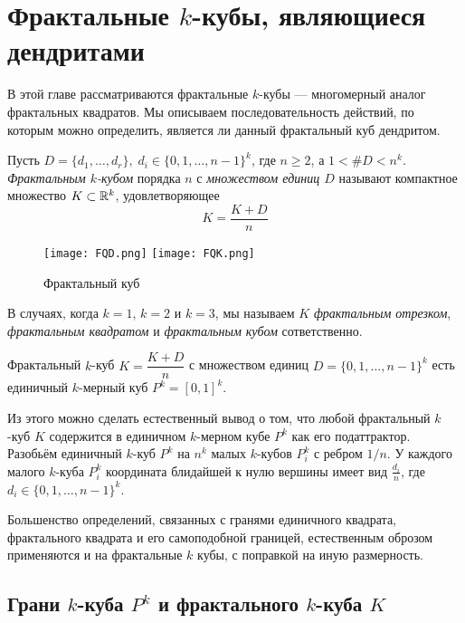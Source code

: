 \newpage
\chapter{Фрактальные $k$-кубы, являющиеся дендритами}

В этой главе рассматриваются фрактальные $k$-кубы --- многомерный аналог фрактальных квадратов.
Мы описываем последовательность действий, по которым можно определить, является ли данный фрактальный куб дендритом.

\begin{definition}
Пусть  $D=\{d_1,\ldots,d_r\},\; d_i\in\{0,1,\ldots,n-1\}^k$, где $n\ge 2$, а $1<\#D<n^k$.\\
{\em Фрактальным $k$-кубом} порядка $n$ с {\em множеством единиц $D$} называют компактное множество $K\subset\mathbb{R}^k$, удовлетворяющее $$K=\dfrac{K+D}{n}$$
\end{definition}

\begin{figure}[H]
    \centering
    \texttt{[image: FQD.png]}
    \hfill
    \texttt{[image: FQK.png]}
    \caption{Фрактальный куб}
\end{figure}

В случаях, когда $k=1$, $k=2$ и $k=3$, мы называем $K$  \emph{фрактальным отрезком}, \emph{фрактальным квадратом} и \emph{фрактальным кубом} сответственно.

\begin{remark}
Фрактальный $k$-куб $K=\dfrac{K+D}{n}$ с множеством единиц $D=\{0,1,\ldots,n-1\}^k$ есть единичный $k$-мерный куб $P^k=[0,1]^k$.
\end{remark}

Из этого можно сделать естественный вывод о том, что любой фрактальный $k$-куб $K$ содержится в единичном $k$-мерном кубе $P^k$ как его податтрактор.\\


Разобьём единичный $k$-куб $P^k$ на $n^k$ малых $k$-кубов $P^k_i$ с ребром $1/n$.
У каждого малого $k$-куба $P^k_i$ координата блидайшей к нулю вершины имеет вид $\frac{d_i}{n}$, где $d_i\in\{0,1,\ldots,n-1\}^k$.


Большенство определений, связанных с гранями единичного квадрата, фрактального квадрата и его самоподобной границей, естественным оброзом применяются и на фрактальные $k$ кубы, с поправкой на иную размерность.



\section{Грани $k$-куба $P^k$ и фрактального $k$-куба $K$} 
 

